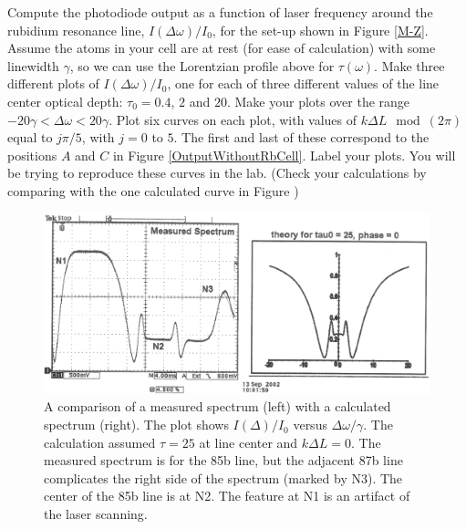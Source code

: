 \documentclass{assignment}
\begin{document}
\begin{prob}
    Compute the photodiode output as a function of laser frequency around the rubidium resonance line, $I(\Delta\omega)/I_0$, for the set-up shown in Figure \ref{M-Z}. Assume the atoms in your cell are at rest (for ease of calculation) with some linewidth $\gamma$, so we can use the Lorentzian profile above for $\tau(\omega)$. Make three different plots of $I(\Delta\omega)/I_0$, one for each of three different values of the line center optical depth: $\tau_0=0.4$, $2$ and $20$. Make your plots over the range $-20\gamma<\Delta\omega<20\gamma$. Plot six curves on each plot, with values of $k\Delta L\mod(2\pi)$ equal to $j\pi/5$, with $j=0$ to $5$. The first and last of these correspond to the positions $A$ and $C$ in Figure \ref{OutputWithoutRbCell}. Label your plots. You will be trying to reproduce these curves in the lab. (Check your calculations by comparing with the one calculated curve in Figure )
    \begin{figure}[h]
        \centering
        \includegraphics[width=.5\textwidth]{ComparisonOfMeasuredAndCalculatedSpectrum.png}
        \caption{A comparison of a measured spectrum (left) with a calculated spectrum (right). The plot shows $I(\Delta)/I_0$ versus $\Delta\omega/\gamma$. The calculation assumed $\tau=25$ at line center and $k\Delta L=0$. The measured spectrum is for the 85b line, but the adjacent 87b line complicates the right side of the spectrum (marked by N3). The center of the 85b line is at N2. The feature at N1 is an artifact of the laser scanning.}
    \end{figure}
\end{prob}
\end{document}
